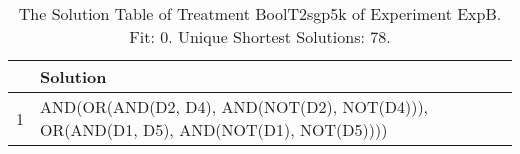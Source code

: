 \begin{table}[ht]
\centering
\begin{tabular}{rp{9cm}}
  \hline
 & Solution \\ 
  \hline
1 & AND(OR(AND(D2, D4), AND(NOT(D2), NOT(D4))), OR(AND(D1, D5), AND(NOT(D1), NOT(D5)))) \\ 
   \hline
\end{tabular}
\caption{The Solution Table of Treatment BoolT2sgp5k of Experiment ExpB. Fit: 0. Unique Shortest Solutions: 78.} 
\end{table}
